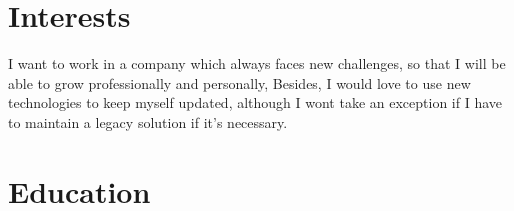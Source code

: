\documentclass[letterpaper]{twentysecondcv} %
\begin{document}
\section{Interests}

I want to work in a company which always faces new challenges, so that I will be able to grow professionally and personally, Besides, I would love to use new technologies to keep myself updated, although I wont take an exception if I have to maintain a legacy solution if it's necessary. 

\section{Education}

\begin{twenty} %
\end{twenty}



\end{document}

